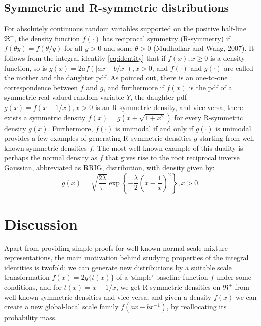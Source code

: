 \documentclass[lineno]{biometrika}
\begin{document}
\subsection{Symmetric and R-symmetric distributions}

For absolutely continuous random variables supported on the positive half-line $\Re^{+}$, the density function $f(\cdot)$ has reciprocal symmetry (R-symmetry) if $f(\theta y) = f(\theta / y)$ for all $y > 0$ and some $\theta >0$ (Mudholkar and Wang, 2007). It follows from the integral identity \eqref{eq:identity} that if $f(x), x \geq 0$ is a density function, so is $g(x) = 2a f(|ax-b/x|), x >0$, and $f(\cdot)$ and $g(\cdot)$ are called the mother and the daughter pdf. As \cite{chaubey2010reciprocal} pointed out, there is an one-to-one correspondence between $f$ and $g$, and furthermore if $f(x)$ is the pdf of a symmetric real-valued random variable $Y$, the daughter pdf $g(x) = f(x-1/x), x>0$ is an R-symmetric density, and vice-versa, there exists a symmetric density $f(x) = g(x+\sqrt{1+x^2})$ for every R-symmetric density $g(x)$. Furthermore, $f(\cdot)$ is unimodal if and only if $g(\cdot)$ is unimodal. \cite{chaubey2010reciprocal} provides a few examples of generating R-symmetric densities $g$ starting from well-known symmetric densities $f$. The most well-known example of this duality is perhaps the normal density as $f$ that gives rise to the root reciprocal inverse Gaussian, abbreviated as RRIG, distribution, with density given by: 
$$
g(x) = \sqrt{\frac{2\lambda}{\pi}} \exp \left\{ - \frac{\lambda}{2} \left( x - \frac{1}{x} \right)^2 \right\}, x >0.
$$

\section{Discussion}

Apart from providing simple proofs for well-known normal scale mixture representations, the main motivation behind studying properties of the integral identities is twofold: we can generate new distributions by a suitable scale transformation $f(x) = 2g\{ t(x) \}$ of a `simple' baseline function $f$ under some conditions, and for $t(x) = x - 1/x$, we get R-symmetric densities on $\Re^+$ from well-known symmetric densities and vice-versa, and given a density $f(x)$ we can create a new global-local scale family $f(ax-bx^{-1})$, by reallocating its probability mass. 
\end{document}
